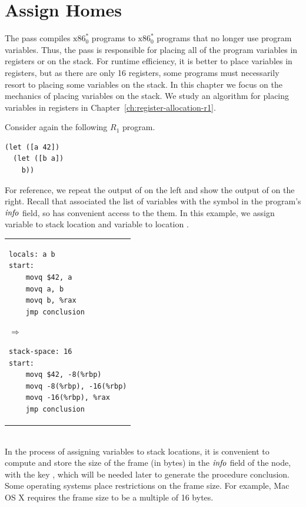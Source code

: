 \documentclass[11pt]{book}
\begin{document}
\section{Assign Homes}
\label{sec:assign-r1}

The  pass compiles $\text{x86}^{*}_0$ programs to
$\text{x86}^{*}_0$ programs that no longer use program variables.
Thus, the  pass is responsible for placing all of
the program variables in registers or on the stack. For runtime
efficiency, it is better to place variables in registers, but as there
are only 16 registers, some programs must necessarily resort to
placing some variables on the stack. In this chapter we focus on the
mechanics of placing variables on the stack. We study an algorithm for
placing variables in registers in
Chapter~\ref{ch:register-allocation-r1}.

Consider again the following $R_1$ program.
\begin{lstlisting}
(let ([a 42])
  (let ([b a])
    b))
\end{lstlisting}
For reference, we repeat the output of  on
the left and show the output of  on the right.
Recall that  associated the list of
variables with the  symbol in the program's $\mathit{info}$
field, so  has convenient access to the them.  In
this example, we assign variable  to stack location
 and variable  to location .\\
\begin{tabular}{l}
  \begin{minipage}{0.4\textwidth}
\begin{lstlisting}[basicstyle=\ttfamily\footnotesize]
locals: a b
start: 
    movq $42, a
    movq a, b
    movq b, %rax
    jmp conclusion
\end{lstlisting}
\end{minipage}
{$\Rightarrow$}
\begin{minipage}{0.4\textwidth}
\begin{lstlisting}[basicstyle=\ttfamily\footnotesize]
stack-space: 16
start:
    movq $42, -8(%rbp)
    movq -8(%rbp), -16(%rbp)
    movq -16(%rbp), %rax
    jmp conclusion
\end{lstlisting}
\end{minipage}
\end{tabular} \\

In the process of assigning variables to stack locations, it is
convenient to compute and store the size of the frame (in bytes) in
the $\mathit{info}$ field of the  node, with the key
, which will be needed later to generate the
procedure conclusion.  Some operating systems place restrictions on
the frame size. For example, Mac OS X requires the frame size to be a
multiple of 16 bytes.
\end{document}
